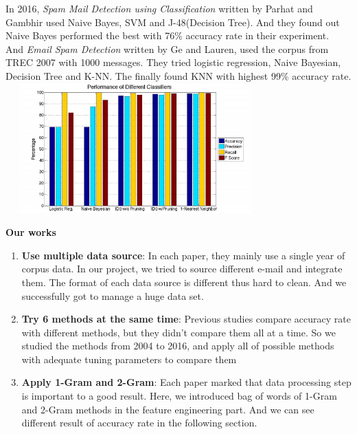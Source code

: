 In 2016, \textit{Spam Mail Detection using Classification} written by Parhat and Gambhir used Naive Bayes, SVM and J-48(Decision Tree). And they found out Naive Bayes performed the best with 76\% accuracy rate in their experiment. \\ And \textit{Email Spam Detection} written by Ge and  Lauren, used the corpus from TREC 2007 with 1000 messages. They tried logistic regression, Naive Bayesian, Decision Tree and K-NN. The finally found KNN with highest 99\% accuracy rate. \\
\includegraphics[width=10cm,height=5cm,keepaspectratio]{2016.png}


\textbf{Our works}\\

\begin{enumerate}
	\item \textbf{Use multiple data source}: In each paper, they mainly use a single year of corpus data. In our project, we tried to source different e-mail and integrate them. The format of each data source is different thus hard to clean. And we successfully got to manage a huge data set. 
	\item \textbf{Try 6 methods at the same time}: Previous studies compare accuracy rate with different methods, but they didn't compare them all at a time. So we studied the methods from 2004 to 2016, and apply all of possible methods with adequate tuning parameters to compare them 
	\item \textbf{Apply 1-Gram and 2-Gram}: Each paper marked that data processing step is important to a good result. Here, we introduced bag of words of 1-Gram and 2-Gram methods in the feature engineering part. And we can see different result of accuracy rate in the following section.
\end{enumerate}

%